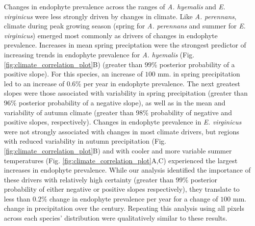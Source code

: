 \documentclass[11pt]{article}
\begin{document}
Changes in endophyte prevalence across the ranges of \emph{A. hyemalis} and \emph{E. virginicus} were less strongly driven by changes in climate. 
Like \emph{A. perennans}, climate during peak growing season (spring for \emph{A. perennans} and summer for \emph{E. virginicus}) emerged most commonly as drivers of changes in endophyte prevalence.
Increases in mean spring preciptation were the strongest predictor of increasing trends in endophyte prevalence for \emph{A. hyemalis} (Fig. \ref{fig:climate_correlation_plot}B) (greater than $99$\% posterior probability of a positive slope).
For this species, an increase of $100$ mm. in spring precipitation led to an increase of $0.6$\% per year in endophyte prevalence.
The next greatest slopes were those associated with variability in spring precipitation (greater than $96$\% posterior probability of a negative slope), as well as in the mean and variability of autumn climate (greater than $98$\% probability of negative and positive slopes, respectively). 
Changes in endophyte prevalence in \emph{E. virginicus} were not strongly associated with changes in most climate drivers, but regions with reduced variability in autumn precipitation (Fig. \ref{fig:climate_correlation_plot}B) and with cooler and more variable summer temperatures (Fig. \ref{fig:climate_correlation_plot}A,C) experienced the largest increases in endophyte prevalence.
While our analysis identified the importance of these drivers with relatively high certainty (greater than $99$\% posterior probability of either negative or positive slopes respectively), they translate to less than $0.2$\% change in endophyte prevalence per year for a change of $100$ mm. change in precipitation over the century.
Repeating this analysis using all pixels across each species' distribution were qualitatively similar to these results.
\end{document}

